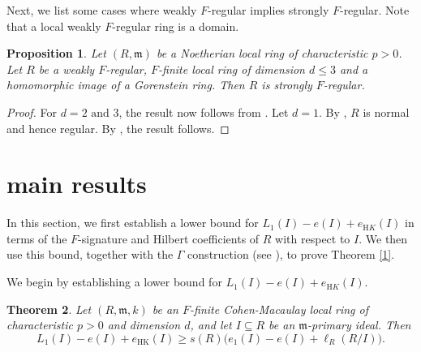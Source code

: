 \documentclass[11pt, reqno]{amsart}
\theoremstyle{plain}
\newtheorem{theorem}{Theorem}[section]
\newtheorem{proposition}[theorem]{Proposition}
\theoremstyle{plain}
\begin{document}
Next, we list some cases where weakly $F$-regular implies strongly $F$-regular. Note that a local weakly $F$-regular ring is a domain. 

\begin{proposition}\label{weakstrong}
    Let $(R,\mathfrak{m})$ be a Noetherian local ring of characteristic $p>0$. Let $R$ be a weakly $F$-regular, $F$-finite local ring of dimension $d\leq 3$ and  a homomorphic image of a Gorenstein ring. Then $R$ is strongly $F$-regular. 
\end{proposition}
\begin{proof}
 For $d=2\text{ and }3$, the result now follows from \cite[pg-736, 742]{Wil95}. Let $d=1$. By \cite[Theorem 3.4(c)]{HH94}, $R$ is normal and hence regular. By \cite[Theorem 5.5(c)]{HH94}, the result follows. 
\end{proof}








\section{main results}
In this section, we first establish a lower bound for $L_1(I)-e(I)+e_{\mathrm HK}(I)$ in terms of the $F$-signature and Hilbert coefficients of $R$ with respect to $I$. We then use this bound, together with the $\Gamma$ construction (see \cite{HH94}), to prove Theorem \ref{1}. 



We begin by establishing a lower bound for $L_1(I)-e(I)+e_{\mathrm HK}(I)$.%


\begin{theorem}\label{Fsignature}
Let $(R,\mathfrak m,k)$ be an $F$-finite Cohen-Macaulay local
ring of characteristic $p>0$ and dimension $d$, and let
$I\subseteq R$ be an $\mathfrak m$-primary ideal. Then
\[
L_1(I)-e(I)+e_{\mathrm{HK}}(I)
\geq
s(R)\bigl(e_1(I)-e(I)+\ell_R(R/I)\bigr).
\]
\end{theorem}
\end{document}
